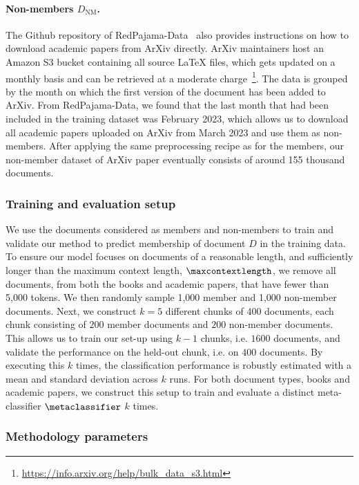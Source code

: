 \documentclass[twocolumn,10pt]{article}
\begin{document}
\paragraph{\textbf{Non-members $D_{\text{NM}}$.}} The Github repository of RedPajama-Data~\cite{together2023redpajama} also provides instructions on how to download academic papers from ArXiv directly. ArXiv maintainers host an Amazon S3 bucket containing all source LaTeX files, which gets updated on a monthly basis and can be retrieved at a moderate charge~\footnote{\url{https://info.arxiv.org/help/bulk_data_s3.html}}. The data is grouped by the month on which the first version of the document has been added to ArXiv. From RedPajama-Data, we found that the last month that had been included in the training dataset was February 2023, which allows us to download all academic papers uploaded on ArXiv from March 2023 and use them as non-members. After applying the same preprocessing recipe as for the members, our non-member dataset of ArXiv paper eventually consists of around 155 thousand documents. 

\subsubsection{Training and evaluation setup}
\label{sec:data_split}

We use the documents considered as members and non-members to train and validate our method to predict membership of document $D$ in the training data. 
To ensure our model focuses on documents of a reasonable length, and sufficiently longer than the maximum context length, $\maxcontextlength$, we remove all documents, from both the books and academic papers, that have fewer than 5,000 tokens. We then randomly sample 1,000 member and 1,000 non-member documents. 
Next, we construct $k=5$ different chunks of $400$ documents, each chunk consisting of $200$ member documents and $200$ non-member documents. This allows us to train our set-up using $k-1$ chunks, i.e. $1600$ documents, and validate the performance on the held-out chunk, i.e. on $400$ documents. By executing this $k$ times, the classification performance is robustly estimated with a mean and standard deviation across $k$ runs.
For both document types, books and academic papers, we construct this setup to train and evaluate a distinct meta-classifier $\metaclassifier$ $k$ times.

\subsubsection{Methodology parameters}
\label{sec:meth_params}
\end{document}

